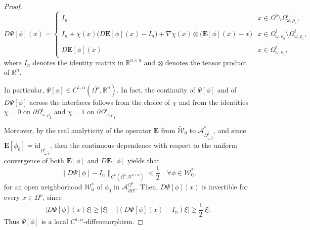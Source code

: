 \documentclass[11pt,reqno,a4paper]{amsart}
\theoremstyle{plain}
\theoremstyle{definition}
\newcommand{\R}{\mathbb{R}}
\begin{document}
\begin{proof}
    \begin{equation*}
        D \Psi[\phi](x)=
        \begin{cases}
         I_n & x \in \overline{\Omega^o} \setminus \Omega^i_{\omega,\rho_2},
         \\
         I_n +\chi(x)\bigl(D \mathbf{E}[\phi](x) - I_n \bigr) + \nabla \chi(x) \otimes \bigl(\mathbf{E}[\phi](x) - x \bigr)  & x \in \overline{\Omega^i_{\omega,\rho_2}} \setminus \Omega^i_{\omega,\rho_1},
         \\
         D \mathbf{E}[\phi](x) & x \in \overline{\Omega^i_{\omega,\rho_1}},
        \end{cases}
    \end{equation*}
    where $I_n$ denotes the identity matrix in $\R^{n\times n}$ and $\otimes$ denotes the tensor product of $\R^n$.
    
    In particular, $\Psi[\phi]\in C^{1,\alpha}(\overline{\Omega^o},\R^n)$. In fact, the continuity of $\Psi[\phi]$ and of $D\Psi[\phi]$ across the interfaces follows from the choice of $\chi$ and from the identities $\chi=0$ on $\partial\Omega^i_{\omega,\rho_2}$ and $\chi=1$ on $\partial\Omega^i_{\omega,\rho_1}$.

    Moreover, by the real analyticity of the operator $\mathbf{E}$ from $\tilde{\mathcal{W}}_0$ to $\mathcal{A}^\ast_{\overline{\Omega^i_{\omega,\tilde{\delta}}}}$, and since $\mathbf{E}[\phi_0] = \mathrm{id}_{\overline{\Omega^i_{\omega,\tilde{\delta}}}}$, then the continuous dependence with respect to the uniform convergence of both $\mathbf{E}[\phi]$ and $D\mathbf{E}[\phi]$ yields that
    \begin{equation*}
        \| D\Psi[\phi] - I_n \|_{C^{0}(\overline{\Omega^o}, \R^{n\times n})} < \frac{1}{2} \quad \forall \phi \in \mathcal{W}^\ast_0,
    \end{equation*}
    for an open neighborhood $\mathcal{W}^\ast_0$ of ${\phi}_0$ in $\mathcal{A}^{\Omega^o}_{\partial\Omega^i}$. Then, $D\Psi[\phi](x)$ is invertible for every $x\in\overline{\Omega^o}$, since
    \[
        |D\Psi[\phi](x)\xi|\geq |\xi|-|(D\Psi[\phi](x)-I_n)\xi|\geq \frac12|\xi|.
    \]
    Thus $\Psi[\phi]$ is a local $C^{1,\alpha}$-diffeomorphism.


\end{proof}
\end{document}
